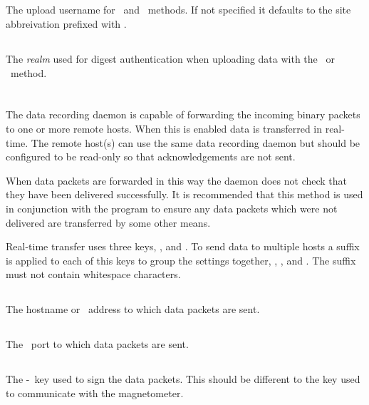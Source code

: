\subsection{}
The upload username for \http\ and \https\ methods. If not specified
it defaults to the site abbreivation prefixed with .

\subsection{}
The \emph{realm} used for digest authentication when uploading data
with the \http\ or \https\ method.

\section{}

The data recording daemon is capable of forwarding the incoming binary
packets to one or more remote hosts. When this is enabled data is
transferred in real-time. The remote host(s) can use the same data
recording daemon but should be configured to be read-only so that
acknowledgements are not sent.

When data packets are forwarded in this way the daemon does not check
that they have been delivered successfully. It is recommended that
this method is used in conjunction with the 
program to ensure any data packets which were not delivered are
transferred by some other means.

Real-time transfer uses three keys, ,
 and . To send data to multiple
hosts a suffix is applied to each of this keys to group the settings
together, \eg, ,  and
. The suffix must not contain whitespace characters.

\subsection{}
The hostname or \ip\ address to which data packets are sent.

\subsection{}
The \udp\ port to which data packets are sent.

\subsection{}
The \hmac-\mdfive\ key used to sign the data packets. This should be
different to the key used to communicate with the magnetometer.

